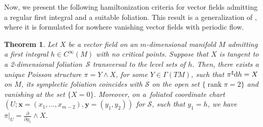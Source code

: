 \documentclass[pdftex]{sigma}%
\newcommand{\dd}{{\rm d}}
\numberwithin{equation}{section}
\newtheorem{Theorem}{Theorem}[section]
\begin{document}
Now, we present the following hamiltonization criteria for vector fields admitting a regular first integral and a suitable foliation.
This result is a generalization of \cite[Theorem 2]{FGS-05}, where it is formulated for nowhere vanishing vector fields with periodic flow.

\begin{Theorem}\label{teo:RegFol}
Let $X$ be a vector field on an $m$-dimensional manifold $M$ admitting a first integral $h\in C^{\infty}(M)$ with no critical points. Suppose that $X$ is tangent to a 2-dimensional foliation~$\mathcal{S}$ transversal to the level sets of $h$. Then, there exists a unique Poisson structure $\pi=Y \wedge X$, for some $Y \in \Gamma(TM)$, such that $\pi^{\sharp}\dd h=X$ on $M$, its symplectic foliation coincides with $\mathcal{S}$ on the open set $\{\operatorname{rank}{\pi} = 2\}$ and vanishing at the set $\{X=0\}$.
Moreover, on a~foliated coordinate chart $(U;\boldsymbol{x} = (x_1,\dots,x_{m-2}),\boldsymbol{y} = (y_1,y_2))$ for $\mathcal{S}$, such that $y_1=h$, we have $\pi|_{U}=\frac{\partial}{\partial y_1}\wedge X$.
\end{Theorem}
\end{document}
